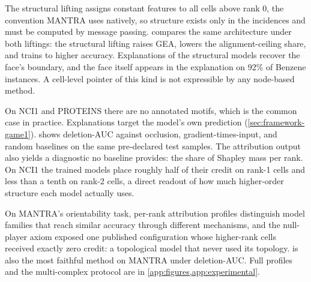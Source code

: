 

 The structural lifting assigns constant features to
all cells above rank 0, the convention MANTRA uses natively, so
structure exists only in the incidences and must be computed by
message passing.  compares the same architecture
under both liftings: the structural lifting raises GEA, lowers the
alignment-ceiling share, and trains to higher accuracy. Explanations
of the structural models recover the face's boundary, and the face
itself appears in the explanation on 92\% of Benzene instances.
A cell-level pointer of this kind is not expressible by any node-based
method.



 On NCI1 and PROTEINS
there are no annotated motifs, which is the common case in practice.
Explanations target the model's own prediction
(\cref{sec:framework-game1}).  shows deletion-AUC
against occlusion, gradient-times-input, and random baselines on the
same pre-declared test samples. The attribution output also yields a
diagnostic no baseline provides: the share of Shapley mass per rank.
On NCI1 the trained models place roughly half of their credit on
rank-1 cells and less than a tenth on rank-2 cells, a direct readout
of how much higher-order structure each model actually uses.

 On MANTRA's orientability task, per-rank
attribution profiles distinguish model families that reach similar
accuracy through different mechanisms, and the null-player axiom
exposed one published configuration whose higher-rank cells received
exactly zero credit: a topological model that never used its topology.
\method is also the most faithful method on MANTRA under deletion-AUC.
Full profiles and the multi-complex protocol are in
\cref{app:figures,app:experimental}.
